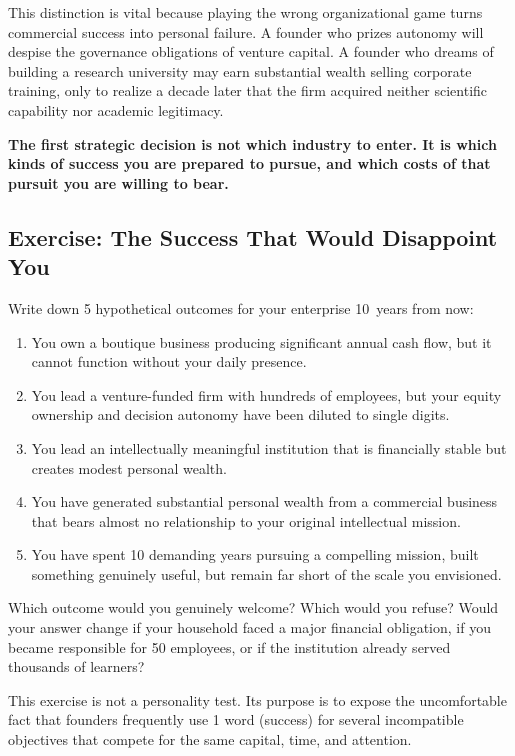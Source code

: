 This distinction is vital because playing the wrong organizational game turns commercial success into personal failure. A founder who prizes autonomy will despise the governance obligations of venture capital. A founder who dreams of building a research university may earn substantial wealth selling corporate training, only to realize a decade later that the firm acquired neither scientific capability nor academic legitimacy.

\textbf{The first strategic decision is not which industry to enter. It is which kinds of success you are prepared to pursue, and which costs of that pursuit you are willing to bear.}

\subsection{Exercise: The Success That Would Disappoint You}

Write down 5 hypothetical outcomes for your enterprise 10~years from now:

\begin{enumerate}[leftmargin=12pt,itemsep=2pt,topsep=1pt,parsep=0pt]
  \item You own a boutique business producing significant annual cash flow, but it cannot function without your daily presence.
  \item You lead a venture-funded firm with hundreds of employees, but your equity ownership and decision autonomy have been diluted to single digits.
  \item You lead an intellectually meaningful institution that is financially stable but creates modest personal wealth.
  \item You have generated substantial personal wealth from a commercial business that bears almost no relationship to your original intellectual mission.
  \item You have spent 10 demanding years pursuing a compelling mission, built something genuinely useful, but remain far short of the scale you envisioned.
\end{enumerate}

Which outcome would you genuinely welcome? Which would you refuse? Would your answer change if your household faced a major financial obligation, if you became responsible for 50 employees, or if the institution already served thousands of learners?

This exercise is not a personality test. Its purpose is to expose the uncomfortable fact that founders frequently use 1 word (success) for several incompatible objectives that compete for the same capital, time, and attention.
